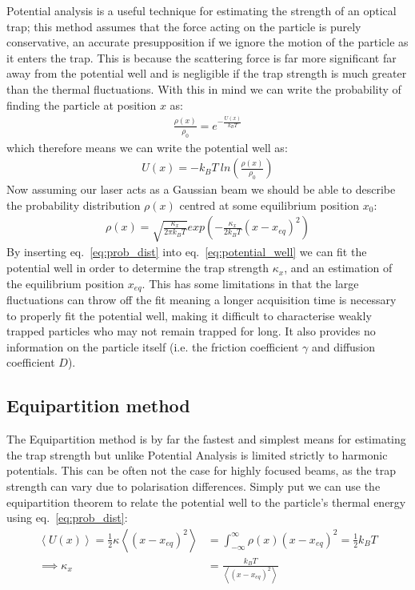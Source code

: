 \documentclass[a4paper,oneside,11pt]{book}
\begin{document}
Potential analysis is a useful technique for estimating the strength of an optical trap; this method assumes that the force acting on the particle is purely conservative, an accurate presupposition if we ignore the motion of the particle as it enters the trap. This is because the scattering force is far more significant far away from the potential well and is negligible if the trap strength is much greater than the thermal fluctuations. With this in mind we can write the probability of finding the particle at position $x$ as:
\begin{align}
	\frac{\rho(x)}{\rho_0} = e^{-\frac{U(x)}{k_{B}T}} 
\end{align}
which therefore means we can write the potential well as:
\begin{align}
	\label{eq:potential_well}
	U(x)=-k_BT\ ln\left(\frac{\rho(x)}{\rho_0} \right)
\end{align}
Now assuming our laser acts as a Gaussian beam we should be able to describe the probability distribution $\rho(x)$ centred at some equilibrium position $x_0$:
\begin{align}
	\label{eq:prob_dist}
	\rho(x)= \sqrt{\frac{\kappa_x}{2\pi k_BT}} exp\left(-\frac{\kappa_x}{2k_BT}(x-x_{eq})^2\right)
\end{align}
By inserting eq.~\ref{eq:prob_dist} into eq.~\ref{eq:potential_well} we can fit the potential well in order to determine the trap strength $\kappa_x$, and an estimation of the equilibrium position $x_{eq}$. This has some limitations in that the large fluctuations can throw off the fit meaning a longer acquisition time is necessary to properly fit the potential well, making it difficult to characterise weakly trapped particles who may not remain trapped for long. It also provides no information on the particle itself (i.e. the friction coefficient $\gamma$ and diffusion coefficient $D$).

\subsection{Equipartition method}
The Equipartition method is by far the fastest and simplest means for estimating the trap strength but unlike Potential Analysis is limited strictly to harmonic potentials. This can be often not the case for highly focused beams, as the trap strength can vary due to polarisation differences. Simply put we can use the equipartition theorem to relate the potential well to the particle's thermal energy using eq.~\ref{eq:prob_dist}:
\begin{align}
	\left<U(x)\right> = \frac{1}{2}\kappa\left<(x-x_{eq})^2\right> &= \int_{-\infty}^{\infty}\rho(x)(x-x_{eq})^2 = \frac{1}{2}k_BT \\
	\implies \kappa_x &= \frac{k_BT}{\left<(x-x_{eq})^2\right>} 
\end{align}
\end{document}
